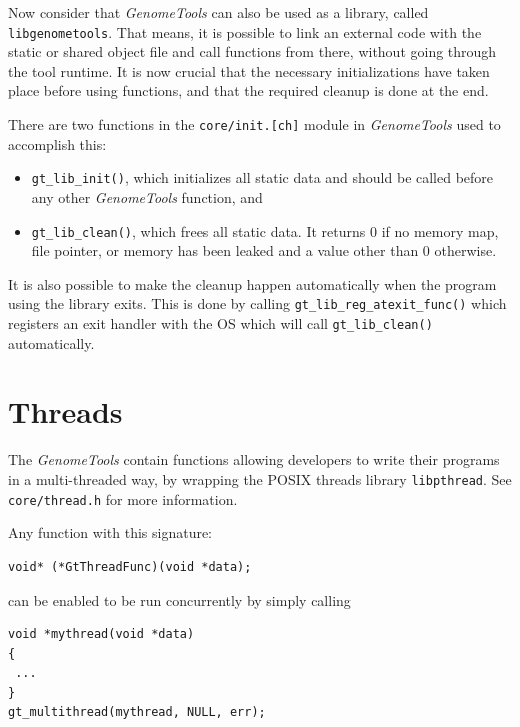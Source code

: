 \documentclass[11pt,final]{article}
\newcommand{\keyword}[1]{\lstinline{#1}}
\newcommand{\Gt}[0]{\emph{GenomeTools}\xspace}
\begin{document}
Now consider that \Gt can also be used as a library, called \keyword{libgenometools}.
That means, it is possible to link an external code with the static or shared
object file and call functions from there, without going through the tool
runtime.
It is now crucial that the necessary initializations have taken place before
using functions, and that the required cleanup is done at the end.

There are two functions in the \keyword{core/init.[ch]} module in \Gt used to
accomplish this:
\begin{itemize}
\item
\keyword{gt_lib_init()}, which initializes all static data and should be called
before any other \Gt function, and
\item
\keyword{gt_lib_clean()}, which frees all static data. It returns 0 if no
memory map, file pointer, or memory has been leaked and a value other than 0
otherwise.
\end{itemize}
It is also possible to make the cleanup happen automatically when the program
using  the library exits. This is done by calling
\keyword{gt_lib_reg_atexit_func()} which registers an exit handler with the OS
which will call \keyword{gt_lib_clean()} automatically.

\section{Threads}
The \Gt contain functions allowing developers to write their programs in a
multi-threaded way, by wrapping the POSIX threads library \keyword{libpthread}.
See \keyword{core/thread.h} for more information.

Any function with this signature:

\begin{lstlisting}
void* (*GtThreadFunc)(void *data);
\end{lstlisting}

can be enabled to be run concurrently by simply calling

\begin{lstlisting}
void *mythread(void *data)
{
 ...
}
gt_multithread(mythread, NULL, err);
\end{lstlisting}
\end{document}
